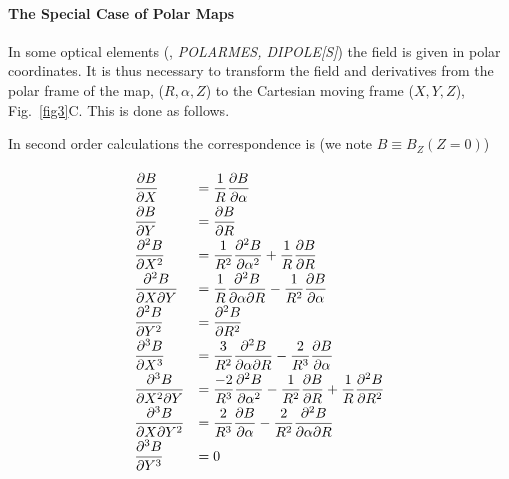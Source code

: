 \paragraph{The Special Case of Polar Maps} 
 
 \noindent In some optical elements (\eg, \textsl{POLARMES, DIPOLE[S]})
 the field is given in polar coordinates. It is thus necessary to transform the field and derivatives from the polar frame 
of the map, ($R,\alpha,Z$) to the Cartesian moving frame ($X,Y,Z$), Fig.~\ref{fig3}C.  This is done as  follows. 

\noindent In second order calculations the correspondence is (we note $B \equiv B_Z(Z=0)$)

 \begin{equation}
{\renewcommand{\arraystretch}{2}
	 \begin{array}{ll}
		 \dfrac{ \partial B }{ \partial X} 
		      &  = \dfrac{ 1 }{ R} \dfrac{\partial B }{ \partial \alpha} \\
		 \dfrac{ \partial B }{ \partial Y}
		      & = \dfrac{ \partial B }{ \partial R}\\
		\dfrac{\partial^2 B }{ \partial X^2} 
		      & =   \dfrac{ 1}{ R^2} \dfrac{\partial^2 B }{ \partial \alpha^ 2} 
		         + \dfrac{1 }{ R} \dfrac{\partial B}{\partial R}\\
		 \dfrac{ \partial^2 B }{ \partial X\partial Y}
		      & =  \dfrac{ 1 }{ R} \dfrac{\partial^ 2 B}{\partial \alpha \partial R}
		         - \dfrac{1 }{ R^2} \dfrac{\partial B }{ \partial\alpha}\\
		\dfrac{ \partial^2 B }{\partial Y^2}   
		      & =  \dfrac{ \partial^2 B }{ \partial R^2} \\
		 \dfrac{ \partial^3 B }{ \partial X^3} 
		      & = \dfrac{ 3 }{ R^2} \dfrac{\partial^2 B }{ \partial \alpha \partial R} 
		        - \dfrac{2 }{ R^3} \dfrac{\partial B }{ \partial \alpha}\\
		\dfrac{\partial^3 B }{ \partial X^2\partial Y} 
		      & = \dfrac{ -2 }{ R^3} \dfrac{\partial^2 B }{ \partial \alpha^2} 
		        - \dfrac{1}{ R^2} \dfrac{\partial B }{ \partial R} 
		        + \dfrac{1 }{ R} \dfrac{\partial^2 B }{\partial R^2}\\
		 \dfrac{ \partial^3 B }{ \partial X\partial Y^2} 
		      & =  \dfrac{ 2 }{ R^3} \dfrac{\partial B}{\partial \alpha} 
		         - \dfrac{2 }{ R^2} \dfrac{\partial^2 B }{ \partial \alpha\partial R}\\
		\dfrac{ \partial^3 B }{ \partial Y^3} 
		      &  =  0
	 \end{array} 
 	\label{eq2-4-8}}
 \end{equation}
 

